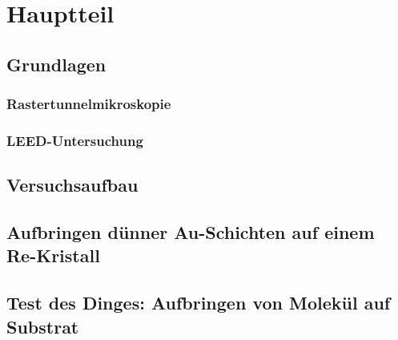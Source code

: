 \documentclass[a4paper,11pt,oneside,final,german,openbib,pdftex]{scrbook}
\begin{document}
\chapter{Hauptteil}




\section{Grundlagen}

% 
\subsection{Rastertunnelmikroskopie}

\subsection{LEED-Untersuchung}



\section{Versuchsaufbau} 

 
\section{Aufbringen dünner Au-Schichten auf einem Re-Kristall}



\section{Test des Dinges: Aufbringen von Molekül auf Substrat} \label{kaptest}




% 
\end{document}
